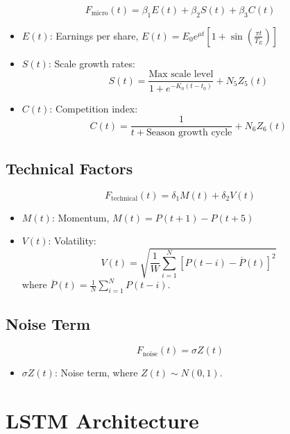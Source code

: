 \documentclass[12pt]{article}
\begin{document}
\[
F_{\text{micro}}(t) = \beta_1 E(t) + \beta_2 S(t) + \beta_3 C(t)
\]

\begin{itemize}
    \item \( E(t) \): Earnings per share, \( E(t) = E_0 e^{\mu t} \left[1 + \sin\left(\frac{\pi t}{T_E}\right)\right] \)
    \item \( S(t) \): Scale growth rates:
    \[
    S(t) = \frac{\text{Max scale level}}{1 + e^{-K_0(t-t_0)}} + N_5 Z_5(t)
    \]
    \item \( C(t) \): Competition index:
    \[
    C(t) = \frac{1}{t + \text{Season growth cycle}} + N_6 Z_6(t)
    \]
\end{itemize}

\subsection*{Technical Factors}

\[
F_{\text{technical}}(t) = \delta_1 M(t) + \delta_2 V(t)
\]

\begin{itemize}
    \item \( M(t) \): Momentum, \( M(t) = P(t+1) - P(t+5) \)
    \item \( V(t) \): Volatility:
    \[
    V(t) = \sqrt{\frac{1}{W} \sum_{i=1}^N [P(t-i) - \overline{P}(t)]^2}
    \]
    where \( \overline{P}(t) = \frac{1}{N} \sum_{i=1}^N P(t-i) \).
\end{itemize}

\subsection*{Noise Term}

\[
F_{\text{noise}}(t) = \sigma Z(t)
\]

\begin{itemize}
    \item \( \sigma Z(t) \): Noise term, where \( Z(t) \sim N(0, 1) \).
\end{itemize}

\section*{LSTM Architecture}
\end{document}
